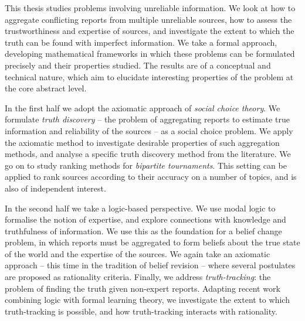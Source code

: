 This thesis studies problems involving unreliable information. We look at how
to aggregate conflicting reports from multiple unreliable sources, how to
assess the trustworthiness and expertise of sources, and investigate the extent
to which the truth can be found with imperfect information.
%
We take a formal approach, developing mathematical frameworks in which these
problems can be formulated precisely and their properties studied. The results
are of a conceptual and technical nature, which aim to elucidate interesting
properties of the problem at the core abstract level.

In the first half we adopt the axiomatic approach of \emph{social choice
theory}. We formulate \emph{truth discovery} -- the problem of aggregating
reports to estimate true information and reliability of the sources -- as a
social choice problem. We apply the axiomatic method to investigate desirable
properties of such aggregation methods, and analyse a specific truth discovery
method from the literature.
%
We go on to study ranking methods for \emph{bipartite tournaments}. This
setting can be applied to rank sources according to their accuracy on a number
of topics, and is also of independent interest.

In the second half we take a logic-based perspective. We use modal logic to
formalise the notion of expertise, and explore connections with knowledge and
truthfulness of information. We use this as the foundation for a belief change
problem, in which reports must be aggregated to form beliefs about the true
state of the world and the expertise of the sources. We again take an axiomatic
approach -- this time in the tradition of belief revision -- where several
postulates are proposed as rationality criteria.
%
Finally, we address \emph{truth-tracking}: the problem of finding the truth
given non-expert reports. Adapting recent work combining logic with formal
learning theory, we investigate the extent to which truth-tracking is possible,
and how truth-tracking interacts with rationality.
